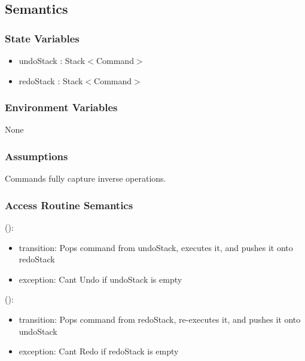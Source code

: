 \documentclass[12pt, titlepage]{article}
\begin{document}
\subsection{Semantics}

\subsubsection{State Variables}
\begin{itemize}
\item undoStack : Stack$<$Command$>$
\item redoStack : Stack$<$Command$>$
\end{itemize}

\subsubsection{Environment Variables}

None
\subsubsection{Assumptions}
Commands fully capture inverse operations.

\subsubsection{Access Routine Semantics}

():
\begin{itemize}
\item transition: Pops command from undoStack, executes it, and pushes it onto redoStack
\item exception: Cant Undo if undoStack is empty
\end{itemize}

():
\begin{itemize}
\item transition: Pops command from redoStack, re-executes it, and pushes it onto undoStack
\item exception: Cant Redo if redoStack is empty
\end{itemize}
\end{document}
